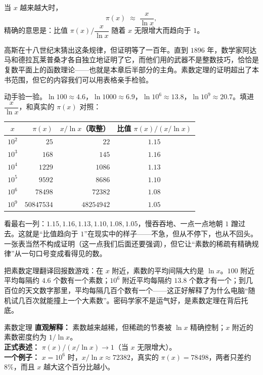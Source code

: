 \begin{dingli}[素数定理]
当 $x$ 越来越大时，
\[
\pi(x)\;\approx\;\frac{x}{\ln x},
\]
精确的意思是：比值 $\pi(x)\big/\dfrac{x}{\ln x}$ 随着 $x$ 无限增大而趋向于 $1$。
\end{dingli}

\begin{zhu}
高斯在十八世纪末猜出这条规律，但证明等了一百年。直到 $1896$ 年，数学家阿达马和德拉瓦莱普桑才各自独立地证明了它，而他们用的武器不是整数技巧，恰恰是复数平面上的函数理论——也就是本章后半部分的主角。素数定理的证明超出了本书范围，但它的内容我们可以用表格亲手检验。
\end{zhu}

动手验一验。$\ln 100\approx4.6$，$\ln 1000\approx6.9$，$\ln 10^{6}\approx13.8$，$\ln 10^{9}\approx20.7$。填进 $\dfrac{x}{\ln x}$，和真实的 $\pi(x)$ 对照：

\begin{center}
\begin{tabular}{crrc}
\toprule
$x$ & $\pi(x)$ & $x/\ln x$（取整） & 比值 $\pi(x)/(x/\ln x)$ \\
\midrule
$10^{2}$ & $25$ & $22$ & $1.15$ \\
$10^{3}$ & $168$ & $145$ & $1.16$ \\
$10^{4}$ & $1229$ & $1086$ & $1.13$ \\
$10^{5}$ & $9592$ & $8686$ & $1.10$ \\
$10^{6}$ & $78498$ & $72382$ & $1.08$ \\
$10^{9}$ & $50847534$ & $48254942$ & $1.05$ \\
\bottomrule
\end{tabular}
\end{center}

看最右一列：$1.15,1.16,1.13,1.10,1.08,1.05$，慢吞吞地、一点一点地朝 $1$ 蹭过去。这就是“比值趋向于 $1$”在现实中的样子——不急，但从不停下，也从不回头。一张表当然不构成证明（这一点我们后面还要强调），但它让“素数的稀疏有精确规律”从一句口号变成看得见的数。

把素数定理翻译回报数游戏：在 $x$ 附近，素数的平均间隔大约是 $\ln x$。$100$ 附近平均每隔约 $4.6$ 个数有一个素数；$10^{6}$ 附近平均每隔约 $13.8$ 个数才有一个；到几百位的天文数字那里，平均每隔几百个数有一个——这正好解释了为什么电脑“随机试几百次就能撞上一个大素数”。密码学家不是运气好，是素数定理在背后托底。

\begin{shuyu}{素数定理}
\textbf{直观解释：} 素数越来越稀，但稀疏的节奏被 $\ln x$ 精确控制；$x$ 附近的素数密度约为 $1/\ln x$。\\
\textbf{正式表述：} $\pi(x)/(x/\ln x)\to 1$（当 $x$ 无限增大）。\\
\textbf{一个例子：} $x=10^{6}$ 时，$x/\ln x\approx72382$，真实的 $\pi(x)=78498$，两者只差约 $8\%$，而且 $x$ 越大这个百分比越小。
\end{shuyu}

